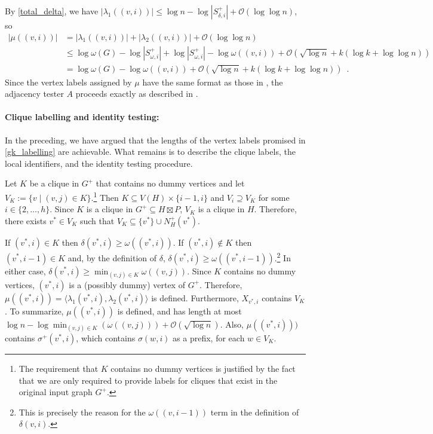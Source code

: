 \documentclass{patmorin}
\let\eqref\cref
\renewcommand{\ge}{\geqslant}
\renewcommand{\le}{\leqslant}
\newcommand{\Oh}{\calO}
\newcommand{\calO}{\mathcal{O}}
\begin{document}
  By \eqref{total_delta}, we have $|\lambda_1((v,i))|\le \log n - \log |S^+_{\delta,i}| + \Oh(\log\log n)$, so
  \begin{align*}
     |\mu((v,i))| & =
     |\lambda_1((v,i))|+|\lambda_2((v,i))| + \Oh(\log\log n) \\
     & \le \log\omega(G) - \log |S^+_{\omega,i}|
      + \log |S^+_{\omega,i}|-\log \omega((v,i)) + \Oh(\sqrt{\log n} + k(\log k+\log\log n)) \\
     & = \log\omega(G) - \log\omega((v,i)) + \Oh(\sqrt{\log n} + k(\log k+\log\log n)) \enspace .
  \end{align*}
  Since the vertex labels assigned by $\mu$ have the same format as those in \cite{alstrup.dahlgaard.ea:optimal,dujmovic.esperet.ea:adjacency}, the adjacency tester $A$ proceeds exactly as described in \cite{alstrup.rauhe:improved,dujmovic.esperet.ea:adjacency}.

  \paragraph{Clique labelling and identity testing:}
  In the preceding, we have argued that the lengths of the vertex labels promised in \cref{gk_labelling} are achievable.
  What remains is to describe the clique labels, the local identifiers, and the identity testing procedure.

  Let $K$ be a clique in $G^+$ that contains no dummy vertices and let $V_K:=\{v\mid (v,j)\in K\}$.\footnote{The requirement that $K$ contains no dummy vertices is justified by the fact that we are only required to provide labels for cliques that exist in the original input graph $G^+$.}
  Then $K\subseteq V(H)\times\{i-1,i\}$  and $V_i\supseteq V_K$ for some $i\in\{2,\ldots,h\}$.  Since $K$ is a clique in $G^+\subseteq H\boxtimes P$, $V_K$ is a clique in $H$.  Therefore, there exists $v^*\in V_K$ such that $V_K\subseteq \{v^*\}\cup N^+_H(v^*)$.

  If $(v^*,i)\in K$ then $\delta(v^*,i)\ge \omega((v^*,i))$.
  If $(v^*,i)\not\in K$ then $(v^*,i-1)\in K$ and, by the definition of $\delta$, $\delta(v^*,i)\ge \omega((v^*,i-1))$.\footnote{This is precisely the reason for the $\omega((v,i-1))$ term in the definition of $\delta(v,i)$.}  In either case, $\delta(v^*,i)\ge\min_{(v,j)\in K}\omega((v,j))$.  Since $K$ contains no dummy vertices, $(v^*,i)$ is a (possibly dummy) vertex of $G^+$.  Therefore, $\mu((v^*,i))=\langle \lambda_1(v^*,i),\lambda_2(v^*,i)\rangle$ is defined.  Furthermore, $X_{v^*,i}$ contains $V_K$.  To summarize, $\mu((v^*,i))$ is defined, and has length at most $\log n - \log\min_{(v,j)\in K}(\omega((v,j))) + \Oh(\sqrt{\log n})$.  Also, $\mu((v^*,i)))$ contains $\sigma^+(v^*,i)$, which contains $\sigma(w,i)$ as a prefix, for each $w\in V_K$.
\end{document}
